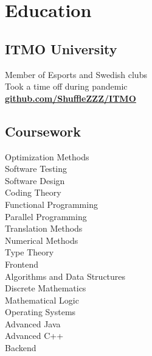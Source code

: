 \documentclass[]{resume}
\begin{document}
%
%

%
%

%
%

\begin{minipage}[t]{0.33\textwidth} 


\section{Education} 

\subsection{ITMO University}
Member of Esports and Swedish clubs \\
Took a time off during pandemic \\
\href{https://github.com/ShuffleZZZ/ITMO#readme}{\underline{\bf github.com/ShuffleZZZ/ITMO}}
\sectionsep


\subsection{Coursework}
Optimization Methods \\
Software Testing \\
Software Design \\
Coding Theory \\
Functional Programming \\
Parallel Programming \\
Translation Methods \\
Numerical Methods \\
Type Theory \\
Frontend \\
Algorithms and Data Structures \\
Discrete Mathematics \\
Mathematical Logic \\
Operating Systems \\
Advanced Java \\
Advanced C++ \\
Backend


\end{minipage}
\end{document}
